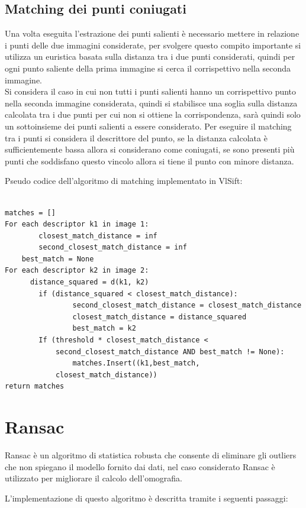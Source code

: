 \documentclass[11pt, oneside]{article}   	%
\begin{document}
\subsection{Matching dei punti coniugati}
Una volta eseguita l'estrazione dei punti salienti è necessario mettere in relazione i punti delle due immagini considerate,
per svolgere questo compito importante si utilizza   un euristica basata sulla distanza tra i due punti considerati, quindi per ogni punto saliente della prima immagine si cerca il corrispettivo nella seconda immagine.\\
Si considera il caso in cui non tutti i punti salienti hanno un corrispettivo punto nella seconda immagine considerata, quindi si stabilisce una soglia sulla distanza calcolata tra i due punti per cui non si ottiene la corrispondenza, sarà quindi solo un sottoinsieme dei punti salienti a essere considerato.
Per eseguire il matching tra i punti si considera il descrittore del punto, se la distanza calcolata è sufficientemente bassa allora si considerano come coniugati, se sono presenti più punti che soddisfano questo vincolo allora si tiene il punto con minore distanza.

Pseudo codice dell'algoritmo di matching implementato in VlSift:

\begin{lstlisting}

matches = []
For each descriptor k1 in image 1:
    	closest_match_distance = inf
    	second_closest_match_distance = inf
	best_match = None
For each descriptor k2 in image 2:
      distance_squared = d(k1, k2)
      	if (distance_squared < closest_match_distance):
            	second_closest_match_distance = closest_match_distance
            	closest_match_distance = distance_squared
            	best_match = k2
    	If (threshold * closest_match_distance <
     		second_closest_match_distance AND best_match != None):
        		matches.Insert((k1,best_match, 
			closest_match_distance))
return matches

\end{lstlisting}


\section{Ransac}
Ransac è un algoritmo di statistica robusta che consente di eliminare gli outliers che non spiegano il modello fornito dai dati, nel caso considerato Ransac è utilizzato per migliorare il calcolo dell'omografia.

L'implementazione di questo algoritmo è descritta tramite i seguenti passaggi:
\end{document}
